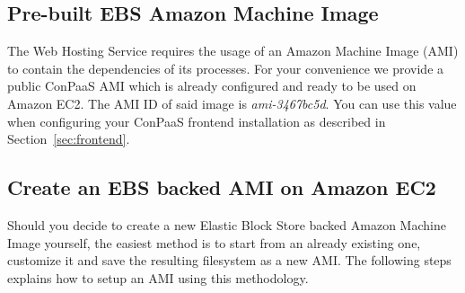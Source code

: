 \documentclass[10pt]{article}
\begin{document}
\subsection{Pre-built EBS Amazon Machine Image}

The Web Hosting Service requires the usage of an Amazon Machine Image (AMI) to
contain the dependencies of its processes. For your convenience we provide a
public ConPaaS AMI which is already configured and ready to be used on Amazon
EC2. The AMI ID of said image is \emph{ami-3467bc5d}. %
You can use this value when configuring your ConPaaS frontend installation as
described in Section~\ref{sec:frontend}.

\subsection{Create an EBS backed AMI on Amazon EC2}
\label{sec:ec2image}

Should you decide to create a new Elastic Block Store backed Amazon Machine
Image yourself, the easiest method is to start from an already existing one,
customize it and save the resulting filesystem as a new AMI. The following
steps explains how to setup an AMI using this methodology.
\end{document}
